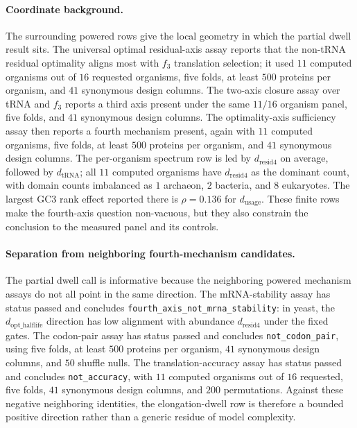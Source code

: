\paragraph{Coordinate background.}
The surrounding powered rows give the local geometry in which the partial dwell result sits.  The universal optimal residual-axis assay reports that the non-tRNA residual optimality aligns most with $f_3$ translation selection; it used $11$ computed organisms out of $16$ requested organisms, five folds, at least $500$ proteins per organism, and $41$ synonymous design columns.  The two-axis closure assay over tRNA and $f_3$ reports a third axis present under the same $11/16$ organism panel, five folds, and $41$ synonymous design columns.  The optimality-axis sufficiency assay then reports a fourth mechanism present, again with $11$ computed organisms, five folds, at least $500$ proteins per organism, and $41$ synonymous design columns.  The per-organism spectrum row is led by $d_{\mathrm{resid4}}$ on average, followed by $d_{\mathrm{tRNA}}$; all $11$ computed organisms have $d_{\mathrm{resid4}}$ as the dominant count, with domain counts imbalanced as $1$ archaeon, $2$ bacteria, and $8$ eukaryotes.  The largest GC3 rank effect reported there is $\rho=0.136$ for $d_{\mathrm{usage}}$.  These finite rows make the fourth-axis question non-vacuous, but they also constrain the conclusion to the measured panel and its controls.

\paragraph{Separation from neighboring fourth-mechanism candidates.}
The partial dwell call is informative because the neighboring powered mechanism assays do not all point in the same direction.  The mRNA-stability assay has status passed and concludes \texttt{fourth\_axis\_not\_mrna\_stability}: in yeast, the $d_{\mathrm{opt\_halflife}}$ direction has low alignment with abundance $d_{\mathrm{resid4}}$ under the fixed gates.  The codon-pair assay has status passed and concludes \texttt{not\_codon\_pair}, using five folds, at least $500$ proteins per organism, $41$ synonymous design columns, and $50$ shuffle nulls.  The translation-accuracy assay has status passed and concludes \texttt{not\_accuracy}, with $11$ computed organisms out of $16$ requested, five folds, $41$ synonymous design columns, and $200$ permutations.  Against these negative neighboring identities, the elongation-dwell row is therefore a bounded positive direction rather than a generic residue of model complexity.

